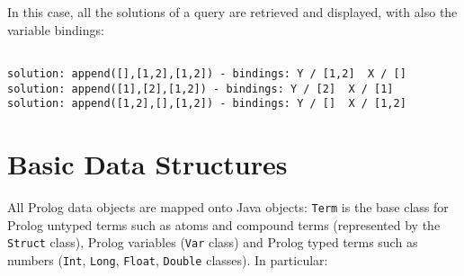 In this case, all the solutions of a query are retrieved and
displayed, with also the variable bindings:
{\small{\begin{verbatim}

solution: append([],[1,2],[1,2]) - bindings: Y / [1,2]  X / []
solution: append([1],[2],[1,2]) - bindings: Y / [2]  X / [1]
solution: append([1,2],[],[1,2]) - bindings: Y / []  X / [1,2]

\end{verbatim}
}}

\section{Basic Data Structures}

\noindent All Prolog data objects are mapped onto Java objects:
\texttt{Term} is the base class for Prolog untyped terms such as
atoms and compound terms (represented by the \texttt{Struct} class),
Prolog variables (\texttt{Var} class) and Prolog typed terms such
as numbers (\texttt{Int}, \texttt{Long}, \texttt{Float},
\texttt{Double} classes).
%
In particular:

